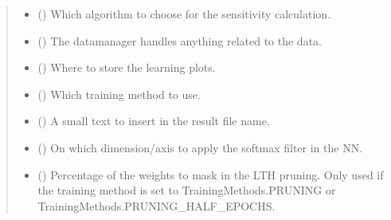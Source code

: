 \documentclass[letterpaper,10pt,english]{sphinxmanual}
\begin{document}
\begin{fulllineitems}
\begin{fulllineitems}
\begin{quote}
\begin{description}
\begin{itemize}
\item {} 
\sphinxAtStartPar
{} ({\hyperref[\detokenize{MLSCAlib.Attacks:MLSCAlib.Attacks.attack.SensitivityMode}]{}}\sphinxstyleliteralemphasis{\sphinxupquote{, }}) \textendash{} Which algorithm to choose for the sensitivity calculation.

\item {} 
\sphinxAtStartPar
{} (\sphinxstyleliteralemphasis{\sphinxupquote{, }}\sphinxstyleliteralemphasis{\sphinxupquote{(}}\sphinxstyleliteralemphasis{\sphinxupquote{)}}) \textendash{} The datamanager handles anything related to the data.

\item {} 
\sphinxAtStartPar
{} (\sphinxstyleliteralemphasis{\sphinxupquote{, }}) \textendash{} Where to store the learning plots.

\item {} 
\sphinxAtStartPar
{} (\sphinxstyleliteralemphasis{\sphinxupquote{, }}) \textendash{} Which training method to use.

\item {} 
\sphinxAtStartPar
{} (\sphinxstyleliteralemphasis{\sphinxupquote{, }}) \textendash{} A small text to insert in the result file name.

\item {} 
\sphinxAtStartPar
{} (\sphinxstyleliteralemphasis{\sphinxupquote{, }}) \textendash{} On which dimension/axis to apply the softmax filter in the NN.

\item {} 
\sphinxAtStartPar
{} (\sphinxstyleliteralemphasis{\sphinxupquote{, }}) \textendash{} Percentage of the weights to mask in the LTH pruning. Only used if the training
method is set to TrainingMethods.PRUNING or TrainingMethods.PRUNING\_HALF\_EPOCHS.


\end{itemize}
\end{description}
\end{quote}
\end{fulllineitems}
\end{fulllineitems}
\end{document}
